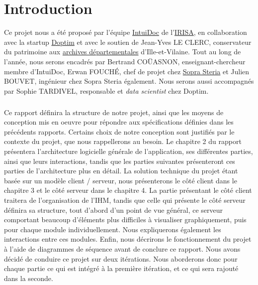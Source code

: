 \chapter{Introduction}
\pagestyle{fancy}
\fancyhf{}

Ce projet nous a été proposé par l’équipe \href{https://www-intuidoc.irisa.fr/}{IntuiDoc} de l’\href{https://www.irisa.fr/}{IRISA}, en collaboration avec la startup \href{http://www.doptim.eu}{Doptim} et avec le soutien de Jean-Yves LE CLERC, conservateur du patrimoine aux \href{http://archives.ille-et-vilaine.fr/fr}{archives départementales} d'Ille-et-Vilaine. Tout au long de l’année, nous serons encadrés par Bertrand COÜASNON, enseignant-chercheur membre d'IntuiDoc, Erwan FOUCHÉ, chef de projet chez \href{https://www.soprasteria.com/fr}{Sopra Steria} et Julien BOUVET, ingénieur chez Sopra Steria également. Nous serons aussi accompagnés par Sophie TARDIVEL, responsable et \textit{data scientist} chez Doptim.

\paragraph{}
Ce rapport définira la structure de notre projet, ainsi que les moyens de conception mis en oeuvre pour répondre aux spécifications définies dans les précédents rapports. Certains choix de notre conception sont justifiés par le contexte du projet, que nous rappellerons au besoin. Le chapitre 2 du rapport présentera l'architecture logicielle générale de l'application, ses différentes parties, ainsi que leurs interactions, tandis que les parties suivantes présenteront ces parties de l'architecture plus en détail. La solution technique du projet étant basée sur un modèle client / serveur, nous présenterons le côté client dans le chapitre 3 et le côté serveur dans le chapitre 4. La partie présentant le côté client traitera de l'organisation de l'IHM, tandis que celle qui présente le côté serveur définira sa structure, tout d'abord d'un point de vue général, ce serveur comportant beaucoup d'éléments plus difficiles à visualiser graphiquement, puis pour chaque module individuellement. Nous expliquerons également les interactions entre ces modules. Enfin, nous décrirons le fonctionnement du projet à l'aide de diagrammes de séquence avant de conclure ce rapport. Nous avons décidé de conduire ce projet sur deux itérations. Nous aborderons donc pour chaque partie ce qui est intégré à la première itération, et ce qui sera rajouté dans la seconde.